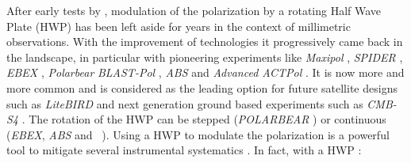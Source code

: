 
After early tests by \citep{1984ApJ...284L..51H}, modulation of the polarization by a rotating Half Wave Plate (HWP) has been left aside for  years in the context of millimetric observations. With the improvement of technologies it progressively came back in the landscape, in particular with pioneering experiments like \emph{Maxipol} \citep{2007ApJ...665...42J}, \emph{SPIDER} \citep{2008SPIE.7010E..2PC}, \emph{EBEX} \citep{2010SPIE.7741E..1CR}, \emph{Polarbear} \citep{2012SPIE.8452E..1CK} \emph{BLAST-Pol} \citep{2014MNRAS.437.2772M}, \emph{ABS} \citep{2014RScI...85c9901K} and \emph{Advanced ACTPol} \citep{2016JLTP..184..772H}. It is now more and more common and is considered as the leading option for future satellite designs such as \emph{LiteBIRD} \citep{2014JLTP..176..733M} and next generation ground based experiments such as \emph{CMB-S4} \citep{2016arXiv161002743A}. The rotation of the HWP can be stepped (\emph{POLARBEAR} \citep{2014ApJ...794..171P}) or continuous  (\emph{EBEX}, \emph{ABS} and \nikad\  \citep{2015fers.confE..16R}).
Using a HWP to modulate the polarization is a powerful tool to mitigate several instrumental systematics \citep{2009MNRAS.397..634B}. In fact, with a HWP :

